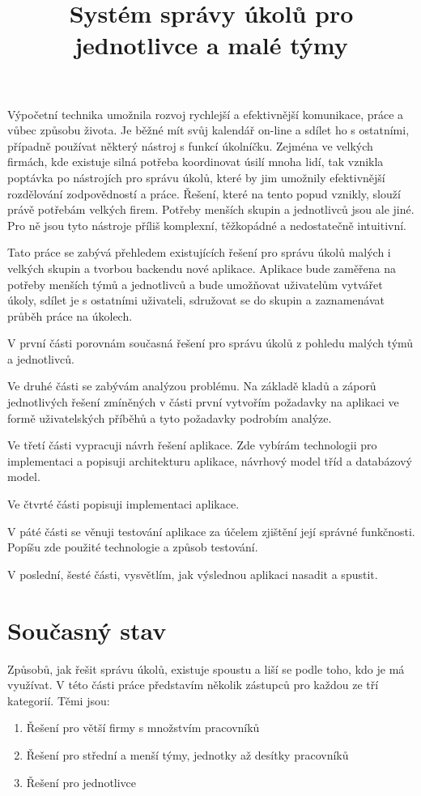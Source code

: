 \documentclass[thesis=B,czech]{FITthesis}[2012/06/26]
\title{Systém správy úkolů pro jednotlivce a malé týmy}
\begin{document}

\begin{introduction}
	Výpočetní technika umožnila rozvoj rychlejší a efektivnější komunikace, práce a vůbec způsobu života. Je běžné mít svůj kalendář on-line a sdílet ho s ostatními, případně používat některý nástroj s funkcí úkolníčku. Zejména ve velkých firmách, kde existuje silná potřeba koordinovat úsilí mnoha lidí, tak vznikla poptávka po nástrojích pro správu úkolů, které by jim umožnily efektivnější rozdělování zodpovědností a práce. Řešení, které na tento popud vznikly, slouží právě potřebám velkých firem. Potřeby menších skupin a jednotlivců jsou ale jiné. Pro ně jsou tyto nástroje příliš komplexní, těžkopádné a nedostatečně intuitivní.

Tato práce se zabývá přehledem existujících řešení pro správu úkolů malých i velkých skupin a tvorbou backendu nové aplikace. Aplikace bude zaměřena na potřeby menších týmů a jednotlivců a bude umožňovat uživatelům vytvářet úkoly, sdílet je s ostatními uživateli, sdružovat se do skupin a zaznamenávat průběh práce na úkolech. 

V první části porovnám současná řešení pro správu úkolů z pohledu malých týmů a jednotlivců. 

Ve druhé části se zabývám analýzou problému. Na základě kladů a záporů jednotlivých řešení zmíněných v části první vytvořím požadavky na aplikaci ve formě uživatelských příběhů a tyto požadavky podrobím analýze.

Ve třetí části vypracuji návrh řešení aplikace. Zde vybírám technologii pro implementaci a popisuji architekturu aplikace, návrhový model tříd a databázový model.

Ve čtvrté části popisuji implementaci aplikace.

V páté části se věnuji testování aplikace za účelem zjištění její správné funkčnosti. Popíšu zde použité technologie a způsob testování.

V poslední, šesté části, vysvětlím, jak výslednou aplikaci nasadit a spustit.
\end{introduction}

\chapter{Současný stav}

Způsobů, jak řešit správu úkolů, existuje spoustu a liší se podle toho, kdo je má využívat. V této části práce představím několik zástupců pro každou ze tří kategorií. Těmi jsou:
\begin{enumerate}
  \item Řešení pro větší firmy s množstvím pracovníků
  \item Řešení pro střední a menší týmy, jednotky až desítky pracovníků
  \item Řešení pro jednotlivce
\end{enumerate}
\end{document}
